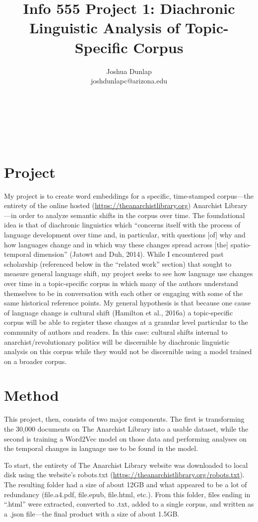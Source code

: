\documentclass[11pt]{article}
\title{Info 555 Project 1: Diachronic Linguistic Analysis of Topic-Specific Corpus}
\author{Joshua Dunlap \\
 joshdunlapc@arizona.edu \\\An
   \\
 \\
   \\
   \\
  \texttt\\}
\begin{document}
\maketitle


\section{Project}

My project is to create word embeddings for a specific, time-stamped corpus—the entirety of the online hosted (\href{https://theanarchistlibrary.org/}{https://theanarchistlibrary.org}) Anarchist Library—in order to analyze semantic shifts in the corpus over time. The foundational idea is that of diachronic linguistics which “concerns itself with the process of language development over time and, in particular, with questions [of] why and how languages change and in which way these changes spread across [the] spatio-temporal dimension” (Jatowt and Duh, 2014). While I encountered past scholarship (referenced below in the “related work” section) that sought to measure general language shift, my project seeks to see how language use changes over time in a topic-specific corpus in which many of the authors understand themselves to be in conversation with each other or engaging with some of the same historical reference points. My general hypothesis is that because one cause of language change is cultural shift (Hamilton et al., 2016a) a topic-specific corpus will be able to register these changes at a granular level particular to the community of authors and readers. In this case: cultural shifts internal to anarchist/revolutionary politics will be discernible by diachronic linguistic analysis on this corpus while they would not be discernible using a model trained on a broader corpus.


\section{Method}

This project, then, consists of two major components. The first is transforming the 30,000 documents on The Anarchist Library into a usable dataset, while the second is training a Word2Vec model on those data and performing analyses on the temporal changes in language use to be found in the model.

To start, the entirety of The Anarchist Library website was downloaded to local disk using the website’s robots.txt (\href{https://theanarchistlibrary.org/robots.txt}{https://theanarchistlibrary.org/robots.txt}). The resulting folder had a size of about 12GB and what appeared to be a lot of redundancy (file.a4.pdf, file.epub, file.html, etc.). From this folder, files ending in “.html” were extracted, converted to .txt, added to a single corpus, and written as a .json file—the final product with a size of about 1.5GB. 
\end{document}
